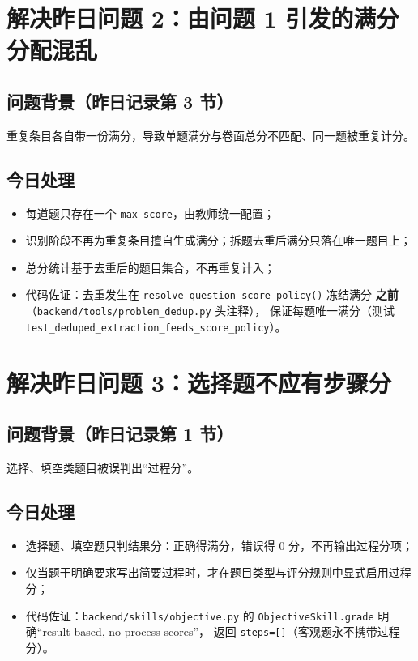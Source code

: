 \documentclass[12pt,a4paper]{ctexart}
\begin{document}
\section{解决昨日问题 2：由问题 1 引发的满分分配混乱}

\subsection{问题背景（昨日记录第 3 节）}
重复条目各自带一份满分，导致单题满分与卷面总分不匹配、同一题被重复计分。

\subsection{今日处理}
\begin{itemize}[leftmargin=2em]
  \item 每道题只存在一个 \texttt{max\_score}，由教师统一配置；
  \item 识别阶段不再为重复条目擅自生成满分；拆题去重后满分只落在唯一题目上；
  \item 总分统计基于去重后的题目集合，不再重复计入；
  \item 代码佐证：去重发生在 \texttt{resolve\_question\_score\_policy()} 冻结满分
        \textbf{之前}（\texttt{backend/tools/problem\_dedup.py} 头注释），
        保证每题唯一满分（测试 \texttt{test\_deduped\_extraction\_feeds\_score\_policy}）。
\end{itemize}

\section{解决昨日问题 3：选择题不应有步骤分}

\subsection{问题背景（昨日记录第 1 节）}
选择、填空类题目被误判出“过程分”。

\subsection{今日处理}
\begin{itemize}[leftmargin=2em]
  \item 选择题、填空题只判结果分：正确得满分，错误得 0 分，不再输出过程分项；
  \item 仅当题干明确要求写出简要过程时，才在题目类型与评分规则中显式启用过程分；
  \item 代码佐证：\texttt{backend/skills/objective.py} 的
        \texttt{ObjectiveSkill.grade} 明确“result-based, no process scores”，
        返回 \texttt{steps=[]}（客观题永不携带过程分）。
\end{itemize}
\end{document}
